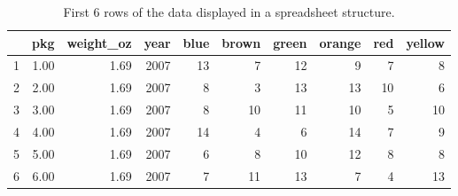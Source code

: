 \begin{table}[H]
\centering
\begin{tabular}{rrrrrrrrrr}
  \hline
 & pkg & weight\_oz & year & blue & brown & green & orange & red & yellow \\ 
  \hline
1 & 1.00 & 1.69 & 2007 &  13 &   7 &  12 &   9 &   7 &   8 \\ 
  2 & 2.00 & 1.69 & 2007 &   8 &   3 &  13 &  13 &  10 &   6 \\ 
  3 & 3.00 & 1.69 & 2007 &   8 &  10 &  11 &  10 &   5 &  10 \\ 
  4 & 4.00 & 1.69 & 2007 &  14 &   4 &   6 &  14 &   7 &   9 \\ 
  5 & 5.00 & 1.69 & 2007 &   6 &   8 &  10 &  12 &   8 &   8 \\ 
  6 & 6.00 & 1.69 & 2007 &   7 &  11 &  13 &   7 &   4 &  13 \\ 
   \hline
\end{tabular}
\caption{First 6 rows of the  data displayed in a spreadsheet structure.}
\label{table:mm_madison}
\end{table}